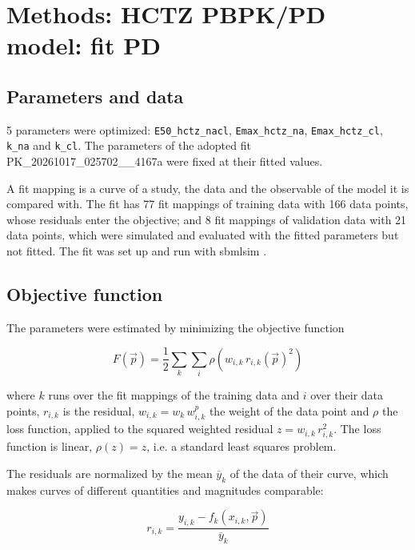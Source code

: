 \section{Methods: HCTZ PBPK/PD model: fit PD}

\subsection{Parameters and data}

5 parameters were optimized: \texttt{E50\_hctz\_nacl}, \texttt{Emax\_hctz\_na}, \texttt{Emax\_hctz\_cl}, \texttt{k\_na} and \texttt{k\_cl}. The parameters of the adopted fit PK\_20261017\_025702\_\_4167a were fixed at their fitted values.

A fit mapping is a curve of a study, the data and the observable of the model it is compared with. The fit has 77 fit mappings of training data with 166 data points, whose residuals enter the objective; and 8 fit mappings of validation data with 21 data points, which were simulated and evaluated with the fitted parameters but not fitted. The fit was set up and run with sbmlsim \cite{Koenig2026_sbmlsim}.

\subsection{Objective function}

The parameters were estimated by minimizing the objective function

\begin{equation}
F(\vec{p}) = \frac{1}{2} \sum_{k} \sum_{i} \rho\left(w_{i,k}\, r_{i,k}(\vec{p})^2\right)
\end{equation}

where $k$ runs over the fit mappings of the training data and $i$ over their data points, $r_{i,k}$ is the residual, $w_{i,k} = w_k\, w^{p}_{i,k}$ the weight of the data point and $\rho$ the loss function, applied to the squared weighted residual $z = w_{i,k}\, r_{i,k}^2$. The loss function is linear, $\rho(z) = z$, i.e. a standard least squares problem.

The residuals are normalized by the mean $\overline{y}_k$ of the data of their curve, which makes curves of different quantities and magnitudes comparable:

\begin{equation}
r_{i,k} = \frac{y_{i,k} - f_k(x_{i,k}, \vec{p})}{\overline{y}_k}
\end{equation}

